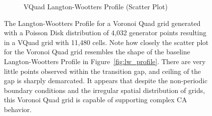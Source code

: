 \documentclass[a4paper,11pt]{report}
\begin{document}
\begin{figure}[htp]
\begin{subfigure}[t]{0.6\textwidth}
  \caption{VQuad Langton-Wootters Profile (Scatter Plot)}
  \label{fig:vor_lw_scatter}
\end{subfigure}
\caption[Voronoi Quad Langton-Wootters Profile]{
  The Langton-Wootters Profile for a Voronoi Quad grid generated with a Poisson Disk distribution of 4,032 generator points resulting in a VQuad grid with 11,480 cells. Note how closely the scatter plot for the Voronoi Quad grid resembles the shape of the baseline Langton-Wootters Profile in Figure~\ref{fig:lw_profile}. There are very little points observed within the transition gap, and ceiling of the gap is sharply demarcated. It appears that despite the non-periodic boundary conditions and the irregular spatial distribution of grids, this Voronoi Quad grid is capable of supporting complex CA behavior.
}
\label{fig:vor_lw_profile}
\end{figure}
\end{document}
